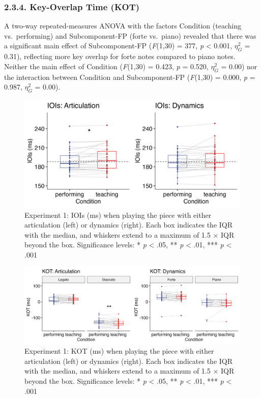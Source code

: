 \documentclass[
  english,
  man,floatsintext]{apa6}
\begin{document}
\hypertarget{key-overlap-time-kot-1}{%
\subsubsection{2.3.4. Key-Overlap Time (KOT)}\label{key-overlap-time-kot-1}}

A two-way repeated-measures ANOVA with the factors Condition (teaching vs.~performing) and Subcomponent-FP (forte vs.~piano) revealed that there was a significant main effect of Subcomponent-FP (\emph{F}(1,30) = 377, \emph{p} \textless{} 0.001, \(\eta_G^2\) = 0.31), reflecting more key overlap for forte notes compared to piano notes. Neither the main effect of Condition (\emph{F}(1,30) = 0.423, \emph{p} = 0.520, \(\eta_G^2\) = 0.00) nor the interaction between Condition and Subcomponent-FP (\emph{F}(1,30) = 0.000, \emph{p} = 0.987, \(\eta_G^2\) = 0.00).

\begin{figure}
\includegraphics[width=1\linewidth]{manuscript_files/figure-latex/plot-ioi-1-1} \caption{\label{fig:ioi-1}Experiment 1: IOIs (ms) when playing the piece with either articulation (left) or dynamics (right). Each box indicates the IQR with the median, and whiskers extend to a maximum of 1.5 × IQR beyond the box. Significance levels: * \textit{p} < .05, ** \textit{p} < .01, *** \textit{p} < .001}\label{fig:plot-ioi-1}
\end{figure}

\begin{figure}
\includegraphics[width=1\linewidth]{manuscript_files/figure-latex/plot-kot-1-1} \caption{\label{fig:kot-1}Experiment 1: KOT (ms) when playing the piece with either articulation (left) or dynamics (right). Each box indicates the IQR with the median, and whiskers extend to a maximum of 1.5 × IQR beyond the box. Significance levels: * \textit{p} < .05, ** \textit{p} < .01, *** \textit{p} < .001}\label{fig:plot-kot-1}
\end{figure}
\end{document}
